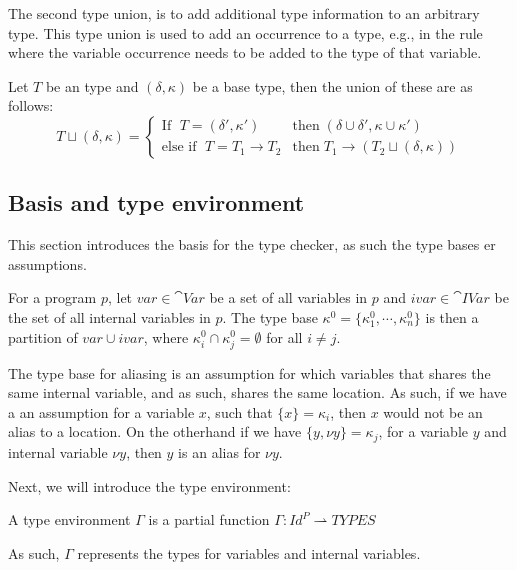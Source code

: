 \documentclass[../../master.tex]{subfiles}
\begin{document}
The second type union, is to add additional type information to an arbitrary type.
This type union is used to add an occurrence to a type, e.g., in the  rule where the variable occurrence needs to be added to the type of that variable.
\begin{definition}
	Let $T$ be an type and $(\delta,\kappa)$ be a base type, then the union of these are as follows:
	\begin{equation*}
		T\sqcup (\delta,\kappa)=
		\left\{\begin{matrix}
			\mbox{If } \; T=(\delta',\kappa')  & \mbox{then} \; (\delta\cup\delta',\kappa\cup\kappa')\\
			\mbox{else if } \; T=T_1\rightarrow T_2 & \mbox{then} \; T_1\rightarrow(T_2\sqcup (\delta,\kappa))
		\end{matrix}\right.
	\end{equation*}
\end{definition}

\subsection{Basis and type environment}
This section introduces the basis for the type checker, as such the type bases er assumptions.
\begin{definition}
	For a program $p$, let $var\in\cat{Var}$ be a set of all variables in $p$ and $ivar\in\cat{IVar}$ be the set of all internal variables in $p$.
	The type base $\kappa^0=\{\kappa^0_1,\cdots,\kappa^0_n\}$ is then a partition of $var\cup ivar$, where $\kappa_i^0\cap\kappa_j^0=\emptyset$ for all $i\neq j$.
\end{definition}
The type base for aliasing is an assumption for which variables that shares the same internal variable, and as such, shares the same location.
As such, if we have a an assumption for a variable $x$, such that $\{x\}=\kappa_i$, then $x$ would not be an alias to a location.
On the otherhand if we have $\{y,\nu y\}=\kappa_j$, for a variable $y$ and internal variable $\nu y$, then $y$ is an alias for $\nu y$.
\bigskip

Next, we will introduce the type environment:
\begin{definition}
	A type environment $\Gamma$ is a partial function $\Gamma:Id^P\rightharpoonup TYPES$
\end{definition}
As such, $\Gamma$ represents the types for variables and internal variables.
\end{document}
